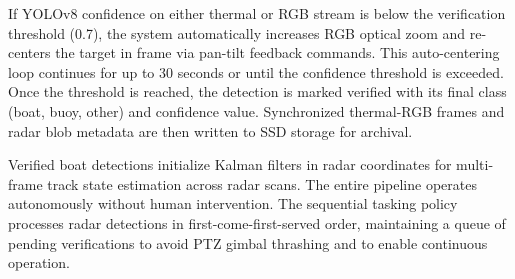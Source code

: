 \documentclass[twocolumn, 10pt]{article}
\begin{document}
If YOLOv8 confidence on either thermal or RGB stream is below the verification threshold (0.7), the system automatically increases RGB optical zoom and re-centers the target in frame via pan-tilt feedback commands. This auto-centering loop continues for up to 30 seconds or until the confidence threshold is exceeded. Once the threshold is reached, the detection is marked verified with its final class (boat, buoy, other) and confidence value. Synchronized thermal-RGB frames and radar blob metadata are then written to SSD storage for archival.

Verified boat detections initialize Kalman filters in radar coordinates for multi-frame track state estimation across radar scans. The entire pipeline operates autonomously without human intervention. The sequential tasking policy processes radar detections in first-come-first-served order, maintaining a queue of pending verifications to avoid PTZ gimbal thrashing and to enable continuous operation.
\end{document}
